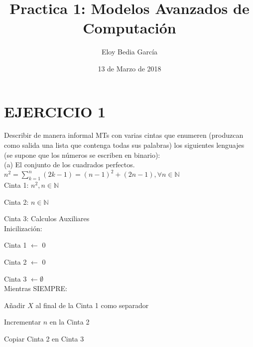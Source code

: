 \documentclass{article}
\title{Practica 1: Modelos Avanzados de Computación}
\author{Eloy Bedia García}
\date{13 de Marzo de 2018}
\begin{document}
\begin{titlepage}
\maketitle
\end{titlepage}

\section{EJERCICIO 1}

Describir de manera informal MTs con varias cintas que enumeren (produzcan como salida una lista que contenga todas sus palabras) los siguientes lenguajes (se supone que los números se escriben en binario):\\

(a) El conjunto de los cuadrados perfectos.\\

\hspace{1cm}$n^{2} = \sum_{k=1}^{n} (2k - 1) = (n - 1)^{2} + (2n - 1), \forall n\in\mathbb{N}$ \\

\hspace{1cm}Cinta 1: $n^{2}, n\in\mathbb{N}$

\hspace{1cm}Cinta 2: $n\in\mathbb{N}$

\hspace{1cm}Cinta 3: Calculos Auxiliares\\

\hspace{1cm}Inicilización:

\hspace{1.5cm}Cinta 1 $\leftarrow$ 0

\hspace{1.5cm}Cinta 2 $\leftarrow$ 0

\hspace{1.5cm}Cinta 3 $\leftarrow \emptyset$\\

\hspace{1cm}Mientras SIEMPRE:

\hspace{1.5cm}Añadir $X$ al final de la Cinta 1 como separador

\hspace{1.5cm}Incrementar $n$ en la Cinta 2

\hspace{1.5cm}Copiar Cinta 2 en Cinta 3
\end{document}
